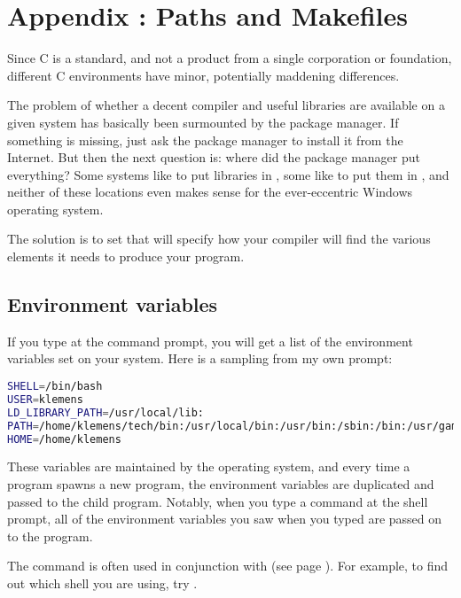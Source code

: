 \renewcommand\thechapter{\Alph{chapter}}
\setcounter{chapter}{1}
\setcounter{section}{0}
\setcounter{subsection}{0}
\setcounter{ex}{0}
\setcounter{lstlisting}{0}
\setcounter{figure}{0}
\chapter{Appendix \thechapter: Paths and Makefiles} \label{make}

Since C is a standard, and not a product from a single corporation
or foundation, different C environments have minor, potentially maddening
differences. 

The problem of whether a decent compiler and useful libraries 
are available on a given system has basically been surmounted by the
package manager. If something is missing, just ask the package manager
to install it from the Internet.
But then the next question is: where did the package manager put
everything? Some systems like to put libraries in , some like
to put them in , and neither of these locations even makes
sense for the ever-eccentric Windows operating system.

The solution is to set  that will specify
how your compiler will find the various elements it needs to produce
your program.

\section{Environment variables} If you type  at the command
prompt, you will get a list of the environment variables set on your
system. Here is a sampling from my own prompt: 
\begin{lstlisting}[language=sh]
SHELL=/bin/bash
USER=klemens
LD_LIBRARY_PATH=/usr/local/lib:
PATH=/home/klemens/tech/bin:/usr/local/bin:/usr/bin:/sbin:/bin:/usr/games:/sbin
HOME=/home/klemens
\end{lstlisting}

These variables are maintained by the operating system, and every time
a program spawns a new program, the environment variables are duplicated
and passed to the child program.  Notably, when you type a command at the
shell prompt, all of the environment variables you saw when you typed
 are passed on to the program.

The  command is often used in conjunction with  (see
page \pageref{grep}). For example, to find out which shell you are using,
try .

